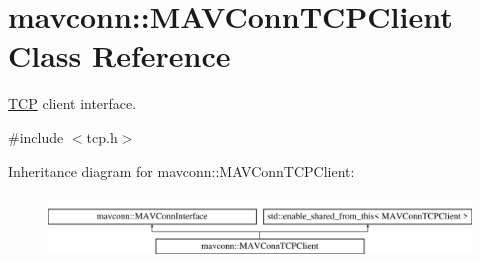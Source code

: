\hypertarget{classmavconn_1_1MAVConnTCPClient}{}\section{mavconn\+::M\+A\+V\+Conn\+T\+C\+P\+Client Class Reference}
\label{classmavconn_1_1MAVConnTCPClient}


\mbox{\hyperlink{classTCP}{T\+CP}} client interface.  




{\ttfamily \#include $<$tcp.\+h$>$}

Inheritance diagram for mavconn\+::M\+A\+V\+Conn\+T\+C\+P\+Client\+:\begin{figure}[H]
\begin{center}
\leavevmode
\includegraphics[height=1.733746cm]{classmavconn_1_1MAVConnTCPClient}
\end{center}
\end{figure}
